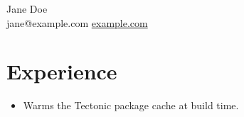 \documentclass[11pt]{article}
\begin{document}
\begin{center}
{\LARGE Jane Doe} \\
jane@example.com \textbullet{} \href{https://example.com}{example.com}
\end{center}
\section{Experience}
\begin{itemize}[leftmargin=*]
  \item Warms the Tectonic package cache at build time.
\end{itemize}
\end{document}
